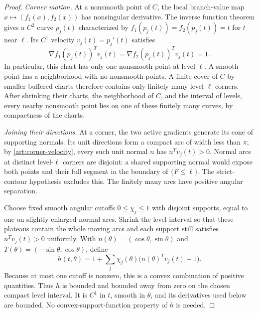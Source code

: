 \begin{proof}
\emph{Corner motion.}
At a nonsmooth point of $C$, the local branch-value map
$x\mapsto(f_1(x),f_2(x))$ has nonsingular derivative. The inverse function
theorem gives a $C^2$ curve $p_j(t)$ characterized by
$f_1(p_j(t))=f_2(p_j(t))=t$ for $t$ near $\ell$. Its $C^1$ velocity
$v_j(t)=p_j'(t)$ satisfies
\begin{equation}\label{art:corner-velocity}
 \nabla f_1(p_j(t))^Tv_j(t)=
 \nabla f_2(p_j(t))^Tv_j(t)=1.
\end{equation}
In particular, this chart has only one nonsmooth point at level $\ell$.
A smooth point has a neighborhood with no nonsmooth points. A finite cover
of $C$ by smaller buffered charts therefore contains only finitely many
level-$\ell$ corners. After shrinking their charts, the neighborhood of
$C$, and the interval of levels, every nearby nonsmooth point lies on one
of these finitely many curves, by compactness of the charts.

\emph{Joining their directions.}
At a corner, the two active gradients generate its cone of supporting
normals. Its unit directions form a compact arc of width less than $\pi$;
by \eqref{art:corner-velocity}, every such unit normal $n$ has
$n^Tv_j(t)>0$. Normal arcs at distinct level-$\ell$ corners are disjoint:
a shared supporting normal would expose both points and their full segment
in the boundary of $\{F\le\ell\}$. The strict-contour hypothesis excludes
this. The finitely many arcs have positive angular separation.

Choose fixed smooth angular cutoffs $0\le\chi_j\le1$ with disjoint supports,
equal to one on slightly enlarged normal arcs. Shrink the level interval so
that these plateaus contain the whole moving arcs and each support still
satisfies $n^Tv_j(t)>0$ uniformly. With
$n(\theta)=(\cos\theta,\sin\theta)$ and
$T(\theta)=(-\sin\theta,\cos\theta)$, define
\begin{equation}\label{art:planar-height}
 h(t,\theta)=1+\sum_j\chi_j(\theta)
                   \bigl(n(\theta)^Tv_j(t)-1\bigr).
\end{equation}
Because at most one cutoff is nonzero, this is a convex combination of
positive quantities. Thus $h$ is bounded and bounded away from zero on the
chosen compact level interval. It is $C^1$ in $t$, smooth in $\theta$, and
its derivatives used below are bounded. No convex-support-function property
of $h$ is needed.


\end{proof}
